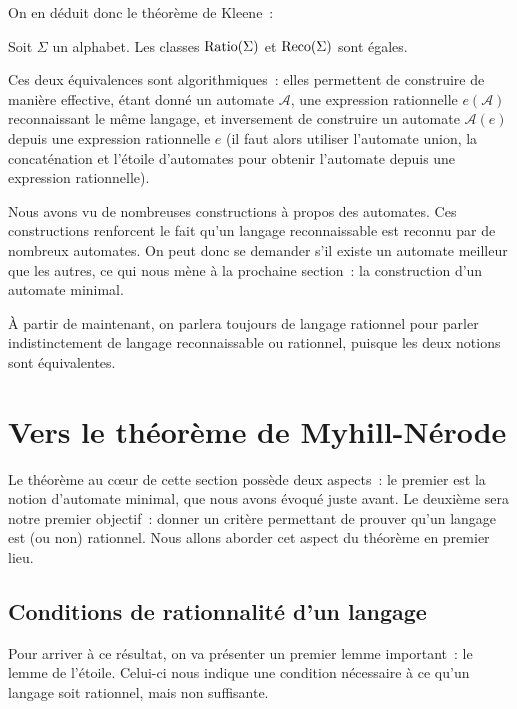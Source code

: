On en déduit donc le théorème de Kleene~:

\begin{theorem}[Kleene]
  Soit $\Sigma$ un alphabet. Les classes $\operatorname{Ratio}(\Sigma)$ et $\operatorname{Reco}(\Sigma)$
  sont égales.
\end{theorem}

\begin{remark}
  Ces deux équivalences sont algorithmiques~: elles permettent de construire
  de manière effective, étant donné un automate $\mathcal A$, une expression
  rationnelle $e(\mathcal A)$ reconnaissant le même langage, et inversement de
  construire un automate $\mathcal A(e)$ depuis une expression rationnelle $e$
  (il faut alors utiliser l'automate union, la concaténation et l'étoile
  d'automates pour obtenir l'automate depuis une expression rationnelle).
\end{remark}

Nous avons vu de nombreuses constructions à propos des automates. Ces
constructions renforcent le fait qu'un langage reconnaissable est reconnu par de
nombreux automates. On peut donc se demander s'il existe un automate meilleur
que les autres, ce qui nous mène à la prochaine section~: la construction d'un
automate minimal.

\`A partir de maintenant, on parlera toujours de langage rationnel pour parler
indistinctement de langage reconnaissable ou rationnel, puisque les deux notions
sont équivalentes.

\section{Vers le théorème de Myhill-Nérode}

Le théorème au c\oe ur de cette section possède deux aspects~: le premier est
la notion d'automate minimal, que nous avons évoqué juste avant. Le deuxième
sera notre premier objectif~: donner un critère permettant de prouver qu'un
langage est (ou non) rationnel. Nous allons aborder cet aspect du théorème en
premier lieu.

\subsection{Conditions de rationnalité d'un langage}

Pour arriver à ce résultat, on va présenter un premier lemme important~: le
lemme de l'étoile. Celui-ci nous indique une condition nécessaire à ce qu'un
langage soit rationnel, mais non suffisante.

